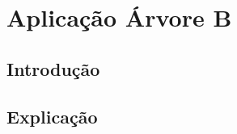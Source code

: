 \chapter{Aplicação Árvore B}
\label{ch:heap} %

% 
\section*{Introdução}


\section*{Explicação}


%
